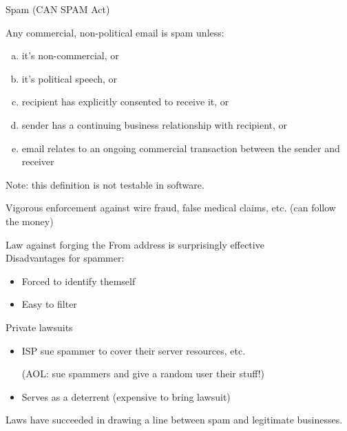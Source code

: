 \begin{definition}{Spam (CAN SPAM Act)}

Any commercial, non-political email is spam unless:
\begin{enumerate}[(a)]
   \item it's non-commercial, or
   \item it's political speech, or
    \item recipient has explicitly consented to receive it, or
    \item sender has a continuing business relationship with recipient, or
    \item email relates to an ongoing commercial transaction between the sender
        and receiver
\end{enumerate}
\end{definition}
Note: this definition is not testable in software.

Vigorous enforcement against wire fraud, false medical claims, etc. (can follow
the money)

Law against forging the From address is surprisingly effective\\
Disadvantages for spammer:
\begin{itemize}
    \item Forced to identify themself
    \item Easy to filter
\end{itemize}

Private lawsuits
\begin{itemize}
    \item ISP sue spammer to cover their server resources, etc.

    (AOL: sue spammers and give a random user their stuff!)
    \item Serves as a deterrent (expensive to bring lawsuit)
\end{itemize}

Laws have succeeded in drawing a line between spam and legitimate businesses. 

